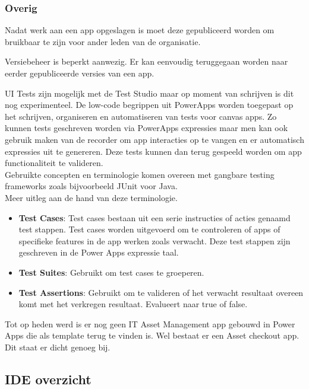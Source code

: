\subsubsection{Overig}
\label{subsec:overig}

Nadat werk aan een app opgeslagen is moet deze gepubliceerd worden om bruikbaar te zijn voor ander leden van de organisatie.

Versiebeheer is beperkt aanwezig. Er kan eenvoudig teruggegaan worden naar eerder gepubliceerde versies van een app.

UI Tests zijn mogelijk met de Test Studio maar op moment van schrijven is dit nog experimenteel. De low-code begrippen uit PowerApps worden toegepast op het schrijven, organiseren en automatiseren van tests voor canvas apps. Zo kunnen tests geschreven worden via PowerApps expressies maar men kan ook gebruik maken van de recorder om app interacties op te vangen en er automatisch expressies uit te genereren. Deze tests kunnen dan terug gespeeld worden om app functionaliteit te valideren. \\ 
Gebruikte concepten en terminologie komen overeen met gangbare testing frameworks zoals bijvoorbeeld JUnit voor Java. \\
Meer uitleg aan de hand van deze terminologie. 
\begin{itemize}
    \item \textbf{Test Cases}: Test cases bestaan uit een serie instructies of acties genaamd test stappen. Test cases worden uitgevoerd om te controleren of apps of specifieke features in de app werken zoals verwacht. Deze test stappen zijn geschreven in de Power Apps expressie taal.
    \item \textbf{Test Suites}: Gebruikt om test cases te groeperen.
    \item \textbf{Test Assertions}: Gebruikt om te valideren of het verwacht resultaat overeen komt met het verkregen resultaat. Evalueert naar true of false.
\end{itemize}
\autocite{MicrosoftDocs2019d}

Tot op heden werd is er nog geen IT Asset Management app gebouwd in Power Apps die als template terug te vinden is. Wel bestaat er een Asset checkout app. Dit staat er dicht genoeg bij. \autocite{Meganathan2019}

\subsection{IDE overzicht}


